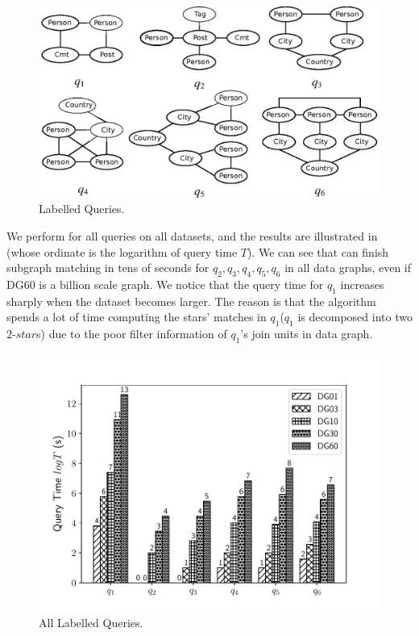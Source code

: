 \begin{figure}[htb]
  \centering
  \includegraphics[scale=0.6]{figures/lq.eps}
  \caption{\small{Labelled Queries.}}
  \label{fig:lq}
\end{figure}

 We perform \gencliqjoin for all queries on all datasets, and the results are illustrated in (whose ordinate is the logarithm of query time $T$). We can see that \gencliqjoin can finish subgraph matching in tens of seconds for $q_2, q_3, q_4, q_5, q_6$ in all data graphs, even if DG60 is a billion scale graph. We notice that the query time for $q_1$ increases sharply when the dataset becomes larger. The reason is that the algorithm spends a lot of time computing the stars' matches in $q_1$($q_1$ is decomposed into two $2\text{-}star$s) due to the poor filter information of $q_1$'s join units in data graph.

\begin{figure}[htb]
  \centering
  \includegraphics[scale=0.4]{figures/exp4.pdf}
  \caption{\small{All Labelled Queries.}}
  \label{fig:all_lq}
\end{figure}

